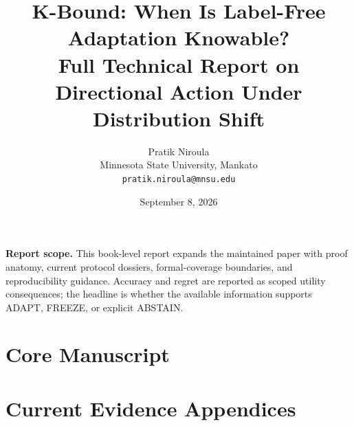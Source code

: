 \documentclass[12pt]{article}
\title{\textbf{K-Bound: When Is Label-Free Adaptation Knowable?}\\[3pt]
\large Full Technical Report on Directional Action Under Distribution Shift}
\author{Pratik Niroula\\
\small Minnesota State University, Mankato\\
\small \texttt{pratik.niroula@mnsu.edu}}
\date{September 8, 2026}
\theoremstyle{plain}
\theoremstyle{definition}
\theoremstyle{remark}
\begin{document}
\maketitle
\begin{abstract}\end{abstract}
\noindent\textbf{Report scope.} This book-level report expands the maintained paper with proof
anatomy, current protocol dossiers, formal-coverage boundaries, and reproducibility guidance.
Accuracy and regret are reported as scoped utility consequences; the headline is whether the
available information supports ADAPT, FREEZE, or explicit ABSTAIN.
\KBoundNamedReleaseBlock{\KBoundRoleFullReport}
\tableofcontents
\listoftables
\listoffigures
\part{Core Manuscript}


\part{Current Evidence Appendices}

{\footnotesize}
\end{document}
